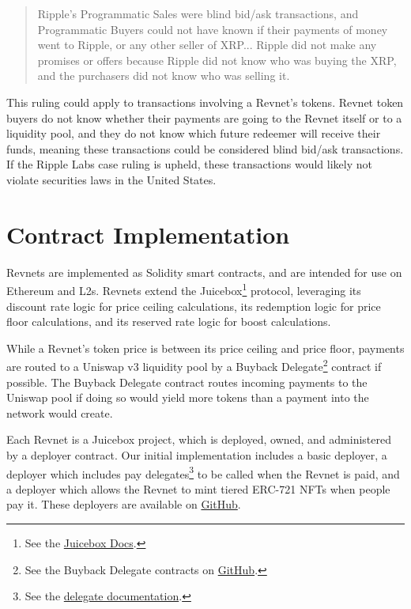 \documentclass{article}
\begin{document}
\begin{quote}
Ripple's Programmatic Sales were blind bid/ask transactions, and Programmatic Buyers could not have known if their payments of money went to Ripple, or any other seller of XRP... Ripple did not make any promises or offers because Ripple did not know who was buying the XRP, and the purchasers did not know who was selling it.
\end{quote}

This ruling could apply to transactions involving a Revnet's tokens. Revnet token buyers do not know whether their payments are going to the Revnet itself or to a liquidity pool, and they do not know which future redeemer will receive their funds, meaning these transactions could be considered blind bid/ask transactions. If the Ripple Labs case ruling is upheld, these transactions would likely not violate securities laws in the United States.

\section{Contract Implementation}

Revnets are implemented as Solidity smart contracts, and are intended for use on Ethereum and L2s. Revnets extend the Juicebox\footnote{See the \href{https://docs.juicebox.money}{Juicebox Docs}.} protocol, leveraging its discount rate logic for price ceiling calculations, its redemption logic for price floor calculations, and its reserved rate logic for boost calculations.

While a Revnet's token price is between its price ceiling and price floor, payments are routed to a Uniswap v3 liquidity pool by a Buyback Delegate\footnote{See the Buyback Delegate contracts on \href{https://github.com/jbx-protocol/juice-buyback}{GitHub}.} contract if possible. The Buyback Delegate contract routes incoming payments to the Uniswap pool if doing so would yield more tokens than a payment into the network would create.

Each Revnet is a Juicebox project, which is deployed, owned, and administered by a deployer contract. Our initial implementation includes a basic deployer, a deployer which includes pay delegates\footnote{See the \href{https://docs.juicebox.money/dev/learn/glossary/delegate/}{delegate documentation}.} to be called when the Revnet is paid, and a deployer which allows the Revnet to mint tiered ERC-721 NFTs when people pay it. These deployers are available on \href{https://github.com/rev-net/revnet-contracts}{GitHub}.
\end{document}
